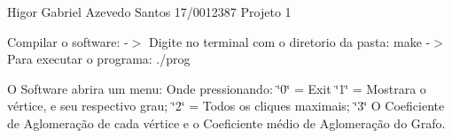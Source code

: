 Higor Gabriel Azevedo Santos 17/0012387 Projeto 1

Compilar o software\+: -\/$>$ Digite no terminal com o diretorio da pasta\+: make -\/$>$ Para executar o programa\+: ./prog

O Software abrira um menu\+: Onde pressionando\+: \char`\"{}0\char`\"{} = Exit \char`\"{}1\char`\"{} = Mostrara o vértice, e seu respectivo grau; \char`\"{}2\char`\"{} = Todos os cliques maximais; \char`\"{}3\char`\"{} O Coeficiente de Aglomeração de cada vértice e o Coeficiente médio de Aglomeração do Grafo. 